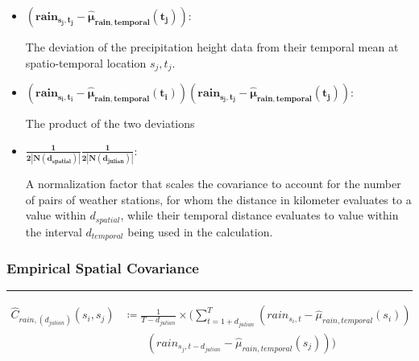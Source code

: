 \documentclass[
  12pt,
]{article}
\begin{document}
\begin{itemize}[label={}]
\begin{adjustwidth}{1cm}{0cm}
                \end{adjustwidth}
              \item $\mathbf{(rain_{s_{j},t_{j}} - \widehat{\mu}_{rain,temporal}(t_{j}))}$:\\ 
                \begin{adjustwidth}{1cm}{0cm} The deviation of the precipitation height data from their temporal mean at spatio-temporal location $s_{j},t_{j}$.
                \end{adjustwidth}
              \item $\mathbf{(rain_{s_{i},t_{i}} - \widehat{\mu}_{rain,temporal}(t_{i}))(rain_{s_{j},t_{j}} - \widehat{\mu}_{rain,temporal}(t_{j}))}$:\\
                \begin{adjustwidth}{1cm}{0cm} 
                  The product of the two deviations
                \end{adjustwidth}
              \item $\mathbf{\frac{1}{2|N(d_{spatial})|}\frac{1}{2|N(d_{julian})|}}$:\\ 
                \begin{adjustwidth}{1cm}{0cm} A normalization factor that scales the covariance to account for the number of pairs of weather stations, for whom the distance in kilometer evaluates to a value within $d_{spatial}$, while their temporal distance evaluates to value within the interval $d_{temporal}$ being used in the calculation.
                \end{adjustwidth}
  \end{itemize}

\clearpage

\hypertarget{empirical-spatial-covariance}{%
\subsubsection{Empirical Spatial
Covariance}\label{empirical-spatial-covariance}}

\rule{1\linewidth}{0.5pt}

\begin{equation}\label{eq:empirical_spatial_covariance_function_equation}
\begin{aligned}
\widehat{C}_{rain,\left(d_{julian}\right)}(s_i,s_j)&\coloneqq\frac{1}{T-d_{julian}}\times\Bigg(\sum_{t=1+d_{julian}}^{T}\left(rain_{s_i,t}-\widehat{\mu}_{rain,temporal}(s_i)\right) \\ 
&\qquad\left(rain_{s_j,t-d_{julian}}-\widehat{\mu}_{rain,temporal}(s_j)\right)\Bigg)
\end{aligned}
\end{equation}
\end{document}

